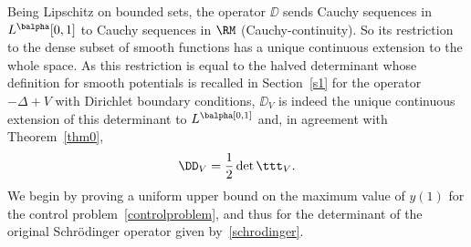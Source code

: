 Being Lipschitz on bounded sets,
the operator $\DD$ sends Cauchy sequences in $L^{\balpha}[0,1]$
to Cauchy sequences in $\RM$ (Cauchy-continuity). So its restriction to the dense
subset of smooth functions has a unique continuous extension to the whole space. As
this restriction is equal to the halved
determinant whose definition for smooth potentials is recalled in Section~\ref{s1} for
the operator $-\Delta+V$ with Dirichlet boundary conditions,
$\DD_V$ is indeed the unique continuous extension of
this determinant to $L^\balpha[0,1]$ and, in agreement with Theorem~\ref{thm0},
\[
\DD_V = \frac{1}{2}\det\ttt_V.
\]
We begin by proving a uniform upper bound on the maximum value of $y(1)$ for the control problem~\eqref{controlproblem}, and thus for
the determinant of the original Schrödinger operator given by~\eqref{schrodinger}.

